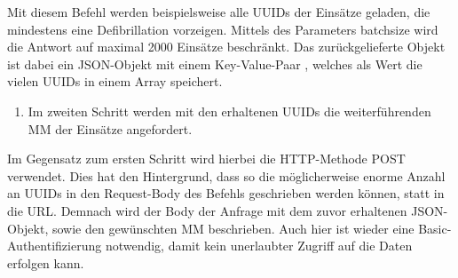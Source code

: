 
Mit diesem Befehl werden beispielsweise alle UUIDs der Einsätze geladen, die mindestens eine Defibrillation vorzeigen. 
Mittels des Parameters \glqq batchsize\grqq{} wird die Antwort auf maximal 2000 Einsätze beschränkt.
Das zurückgelieferte Objekt ist dabei ein JSON-Objekt mit einem Key-Value-Paar , welches als Wert die vielen \gls{UUID}s in einem Array speichert.

\begin{enumerate}[resume]
\item Im zweiten Schritt werden mit den erhaltenen UUIDs die weiterführenden \gls{MM} der Einsätze angefordert.
\end{enumerate}

Im Gegensatz zum ersten Schritt wird hierbei die HTTP-Methode \glqq POST\grqq{} verwendet.
Dies hat den Hintergrund, dass so die möglicherweise enorme Anzahl an \gls{UUID}s in den Request-Body des Befehls geschrieben werden können, statt in die URL.
Demnach wird der Body der Anfrage mit dem zuvor erhaltenen JSON-Objekt, sowie den gewünschten \gls{MM} beschrieben.
Auch hier ist wieder eine Basic-Authentifizierung notwendig, damit kein unerlaubter Zugriff auf die Daten erfolgen kann.

